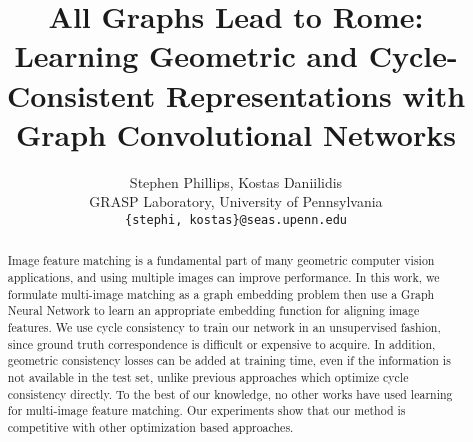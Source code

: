 \documentclass[10pt,twocolumn,letterpaper]{article}
\begin{document}
\title{All Graphs Lead to Rome: Learning Geometric and Cycle-Consistent Representations with Graph Convolutional Networks}

\author{Stephen Phillips, Kostas Daniilidis \\
GRASP Laboratory, University of Pennsylvania\\
{\tt\small \{stephi, kostas\}@seas.upenn.edu}
}



\maketitle

\begin{abstract}
    Image feature matching is a fundamental part of many geometric computer vision applications, and using multiple images can improve performance.
    In this work, we formulate multi-image matching as a graph embedding problem then use a Graph Neural Network to learn an appropriate embedding function for aligning image features.
    We use cycle consistency to train our network in an unsupervised fashion, since ground truth correspondence is difficult or expensive to acquire.
    In addition, geometric consistency losses can be added at training time, even if the information is not available in the test set, unlike previous approaches which optimize cycle consistency directly.
    To the best of our knowledge, no other works have used learning for multi-image feature matching.
    Our experiments show that our method is competitive with other optimization based approaches.
\end{abstract}
\end{document}
